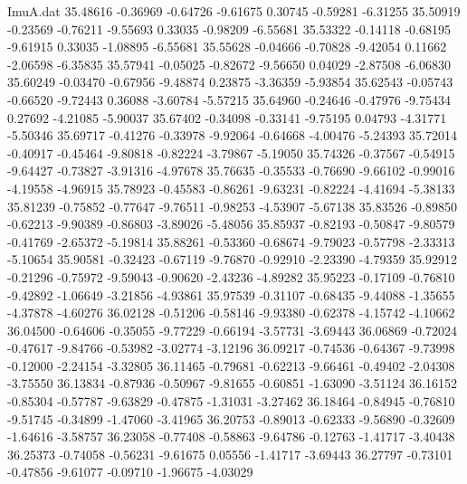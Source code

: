 \begin{filecontents}{ImuA.dat}
  35.48616   -0.36969   -0.64726   -9.61675    0.30745   -0.59281   -6.31255
  35.50919   -0.23569   -0.76211   -9.55693    0.33035   -0.98209   -6.55681
  35.53322   -0.14118   -0.68195   -9.61915    0.33035   -1.08895   -6.55681
  35.55628   -0.04666   -0.70828   -9.42054    0.11662   -2.06598   -6.35835
  35.57941   -0.05025   -0.82672   -9.56650    0.04029   -2.87508   -6.06830
  35.60249   -0.03470   -0.67956   -9.48874    0.23875   -3.36359   -5.93854
  35.62543   -0.05743   -0.66520   -9.72443    0.36088   -3.60784   -5.57215
  35.64960   -0.24646   -0.47976   -9.75434    0.27692   -4.21085   -5.90037
  35.67402   -0.34098   -0.33141   -9.75195    0.04793   -4.31771   -5.50346
  35.69717   -0.41276   -0.33978   -9.92064   -0.64668   -4.00476   -5.24393
  35.72014   -0.40917   -0.45464   -9.80818   -0.82224   -3.79867   -5.19050
  35.74326   -0.37567   -0.54915   -9.64427   -0.73827   -3.91316   -4.97678
  35.76635   -0.35533   -0.76690   -9.66102   -0.99016   -4.19558   -4.96915
  35.78923   -0.45583   -0.86261   -9.63231   -0.82224   -4.41694   -5.38133
  35.81239   -0.75852   -0.77647   -9.76511   -0.98253   -4.53907   -5.67138
  35.83526   -0.89850   -0.62213   -9.90389   -0.86803   -3.89026   -5.48056
  35.85937   -0.82193   -0.50847   -9.80579   -0.41769   -2.65372   -5.19814
  35.88261   -0.53360   -0.68674   -9.79023   -0.57798   -2.33313   -5.10654
  35.90581   -0.32423   -0.67119   -9.76870   -0.92910   -2.23390   -4.79359
  35.92912   -0.21296   -0.75972   -9.59043   -0.90620   -2.43236   -4.89282
  35.95223   -0.17109   -0.76810   -9.42892   -1.06649   -3.21856   -4.93861
  35.97539   -0.31107   -0.68435   -9.44088   -1.35655   -4.37878   -4.60276
  36.02128   -0.51206   -0.58146   -9.93380   -0.62378   -4.15742   -4.10662
  36.04500   -0.64606   -0.35055   -9.77229   -0.66194   -3.57731   -3.69443
  36.06869   -0.72024   -0.47617   -9.84766   -0.53982   -3.02774   -3.12196
  36.09217   -0.74536   -0.64367   -9.73998   -0.12000   -2.24154   -3.32805
  36.11465   -0.79681   -0.62213   -9.66461   -0.49402   -2.04308   -3.75550
  36.13834   -0.87936   -0.50967   -9.81655   -0.60851   -1.63090   -3.51124
  36.16152   -0.85304   -0.57787   -9.63829   -0.47875   -1.31031   -3.27462
  36.18464   -0.84945   -0.76810   -9.51745   -0.34899   -1.47060   -3.41965
  36.20753   -0.89013   -0.62333   -9.56890   -0.32609   -1.64616   -3.58757
  36.23058   -0.77408   -0.58863   -9.64786   -0.12763   -1.41717   -3.40438
  36.25373   -0.74058   -0.56231   -9.61675    0.05556   -1.41717   -3.69443
  36.27797   -0.73101   -0.47856   -9.61077   -0.09710   -1.96675   -4.03029

\end{filecontents}
